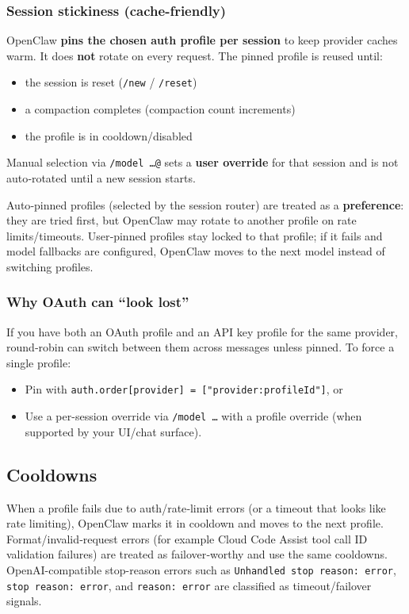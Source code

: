 \subsubsection{Session stickiness (cache-friendly)}


OpenClaw \textbf{pins the chosen auth profile per session} to keep provider caches warm.
It does \textbf{not} rotate on every request. The pinned profile is reused until:

\begin{itemize}
  \item the session is reset (\texttt{/new} / \texttt{/reset})
  \item a compaction completes (compaction count increments)
  \item the profile is in cooldown/disabled
\end{itemize}


Manual selection via \texttt{/model …@} sets a \textbf{user override} for that session
and is not auto‑rotated until a new session starts.

Auto‑pinned profiles (selected by the session router) are treated as a \textbf{preference}:
they are tried first, but OpenClaw may rotate to another profile on rate limits/timeouts.
User‑pinned profiles stay locked to that profile; if it fails and model fallbacks
are configured, OpenClaw moves to the next model instead of switching profiles.

\subsubsection{Why OAuth can “look lost”}


If you have both an OAuth profile and an API key profile for the same provider, round‑robin can switch between them across messages unless pinned. To force a single profile:

\begin{itemize}
  \item Pin with \texttt{auth.order[provider] = ["provider:profileId"]}, or
  \item Use a per-session override via \texttt{/model …} with a profile override (when supported by your UI/chat surface).
\end{itemize}


\subsection{Cooldowns}


When a profile fails due to auth/rate‑limit errors (or a timeout that looks
like rate limiting), OpenClaw marks it in cooldown and moves to the next profile.
Format/invalid‑request errors (for example Cloud Code Assist tool call ID
validation failures) are treated as failover‑worthy and use the same cooldowns.
OpenAI-compatible stop-reason errors such as \texttt{Unhandled stop reason: error},
\texttt{stop reason: error}, and \texttt{reason: error} are classified as timeout/failover
signals.

